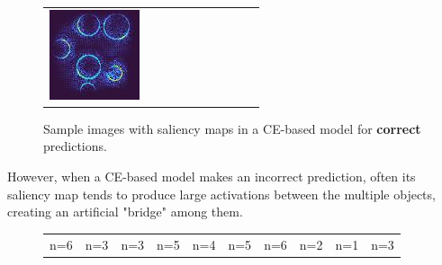 \documentclass[letterpaper]{article} %
\begin{document}
\begin{figure}[!htbp]
\begin{tabular}{cccccccccc}
\multicolumn{1}{c}{\includegraphics[width=0.07\columnwidth]{figures/appendix/ce/true/92_slc.jpg}} \hspace{-11pt}
\end{tabular}
\caption{Sample images with saliency maps in a CE-based model for \textbf{correct} predictions.}
\label{fig:ce_true}
\end{figure}

However, when a CE-based model makes an incorrect prediction, often its saliency map tends to produce large activations between the multiple objects, creating an artificial "bridge" among them.

\begin{figure}[!htbp]
\centering
\footnotesize 
\begin{tabular}{cccccccccc}
\multicolumn{1}{c}{n=6} \hspace{-11pt} &  
\multicolumn{1}{c}{n=3} \hspace{-11pt} & 
\multicolumn{1}{c}{n=3} \hspace{-11pt} & 
\multicolumn{1}{c}{n=5} \hspace{-11pt} & 
\multicolumn{1}{c}{n=4} \hspace{-11pt} & 
\multicolumn{1}{c}{n=5} \hspace{-11pt} & 
\multicolumn{1}{c}{n=6} \hspace{-11pt} &  
\multicolumn{1}{c}{n=2} \hspace{-11pt} & 
\multicolumn{1}{c}{n=1} \hspace{-11pt} & 
\multicolumn{1}{c}{n=3} \\ 


\end{tabular}
\end{figure}
\end{document}
